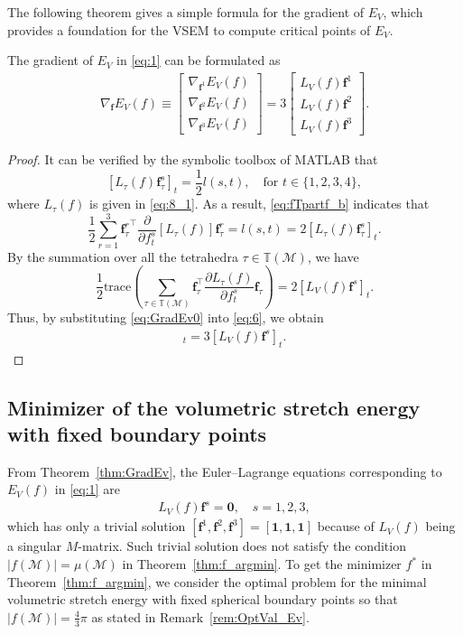 \documentclass[onefignum,onetabnum]{siamonline220329}
\numberwithin{equation}{section}
\def\f{\mathbf{f}}
\def\0{\mathbf{0}}
\def\1{\mathbf{1}}
\begin{document}
\begin{sloppypar}
The following theorem gives a simple formula for the gradient of $E_V$, which provides a foundation for the VSEM to compute critical points of $E_V$.

\begin{theorem} \label{thm:GradEv}
The gradient of $E_V$ in \eqref{eq:1} can be formulated as
\begin{align*}
\nabla_\f E_V(f) \equiv
\begin{bmatrix}
\nabla_{\f^1} E_V(f) \\
\nabla_{\f^2} E_V(f) \\
\nabla_{\f^3} E_V(f) 
\end{bmatrix}
= 3\begin{bmatrix}
L_V(f) \f^1 \\
L_V(f) \f^2 \\
L_V(f) \f^3 
\end{bmatrix}.
\end{align*}
\end{theorem}
\begin{proof} 
It can be verified by the symbolic toolbox of MATLAB that 
$$
[L_\tau(f) \f_\tau^s]_t = \frac{1}{2} l(s,t), \quad\text{for $t\in\{1,2,3,4\}$},
$$
where $L_{\tau}(f)$ is given in \eqref{eq:8_1}.
As a result, \eqref{eq:fTpartf_b} indicates that
$$
\frac{1}{2} \sum_{r=1}^3 {\f_\tau^r}^\top \frac{\partial}{\partial f_t^s} [L_\tau(f)] \f_\tau^r 
= l(s,t)
= 2 [L_\tau(f) \f_\tau^s]_t.
$$
By the summation over all the tetrahedra $\tau\in\mathbb{T}(\mathcal{M})$, we have
\begin{equation} \label{eq:GradEv0}
\frac{1}{2}\mathrm{trace}\left(\sum_{\tau \in \mathbb{T}(\mathcal{M})} \mathbf{f}_{\tau}^{\top}\frac{\partial L_{\tau}(f)}{\partial f_t^s}\mathbf{f}_{\tau} \right) = 2 [L_V(f) \f^s]_t.
\end{equation}
Thus, by substituting \eqref{eq:GradEv0} into \eqref{eq:6}, we obtain
\begin{align*}
[\nabla_{\f^s} E_V(f)]_t = 3 [L_V(f) \f^s]_t.
\end{align*}
\end{proof}

\subsection{Minimizer of the volumetric stretch energy with fixed boundary points} \label{subsec:min_VSEM_fb}
From Theorem~\ref{thm:GradEv}, the Euler--Lagrange equations corresponding to $E_V(f)$ in \eqref{eq:1} are
\begin{align*}
L_{V}(f)\mathbf{f}^s = \0,\quad s=1, 2, 3,
\end{align*}
which has only a trivial solution $[\mathbf{f}^1, \mathbf{f}^2, \mathbf{f}^3] = [\1, \1, \1]$ because of $L_V(f)$ being a singular $M$-matrix. Such trivial solution does not satisfy the condition $| f(\mathcal{M}) | = \mu(\mathcal{M}) $ in Theorem~\ref{thm:f_argmin}. To get the minimizer $f^*$ in Theorem~\ref{thm:f_argmin}, we consider the optimal problem for the minimal volumetric stretch energy with fixed spherical boundary points so that $| f(\mathcal{M}) | = \frac{4}{3} \pi$ as stated in Remark~\ref{rem:OptVal_Ev}.


\end{sloppypar}
\end{document}
